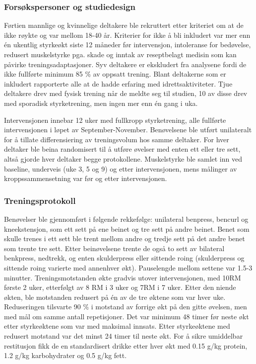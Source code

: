 \documentclass[
  letterpaper,
  DIV=11,
  numbers=noendperiod]{scrartcl}
\begin{document}
\hypertarget{forsuxf8kspersoner-og-studiedesign}{%
\subsubsection{Forsøkspersoner og
studiedesign}\label{forsuxf8kspersoner-og-studiedesign}}

Førtien mannlige og kvinnelige deltakere ble rekruttert etter kriteriet
om at de ikke røykte og var mellom 18-40 år. Kriterier for ikke å bli
inkludert var mer enn én ukentlig styrkeøkt siste 12 måneder før
intervensjon, intoleranse for bedøvelse, redusert muskelstyrke pga.
skade og inntak av reseptbelagt medisin som kan påvirke
treningsadaptasjoner. Syv deltakere er ekskludert fra analysene fordi de
ikke fullførte minimum 85 \% av oppsatt trening. Blant deltakerne som er
inkludert rapporterte alle at de hadde erfaring med idrettsaktiviteter.
Tjue deltakere drev med fysisk trening når de meldte seg til studien, 10
av disse drev med sporadisk styrketrening, men ingen mer enn én gang i
uka.

Intervensjonen innebar 12 uker med fullkropp styrketrening, alle
fullførte intervensjonen i løpet av September-November. Benøvelsene ble
utført unilateralt for å tillate differensiering av treningsvolum hos
samme deltaker. For hver deltaker ble beina randomisert til å utføre
øvelser med enten ett eller tre sett, altså gjorde hver deltaker begge
protokollene. Muskelstyrke ble samlet inn ved baseline, underveis (uke
3, 5 og 9) og etter intervensjonen, mens målinger av kroppssammensetning
var før og etter intervensjonen.

\hypertarget{treningsprotokoll}{%
\subsubsection{Treningsprotokoll}\label{treningsprotokoll}}

Benøvelser ble gjennomført i følgende rekkefølge: unilateral benpress,
bencurl og kneekstensjon, som ett sett på ene beinet og tre sett på
andre beinet. Benet som skulle trenes i ett sett ble trent mellom andre
og tredje sett på det andre benet som trente tre sett. Etter
beinøvelsene trente de også to sett av bilateral benkpress, nedtrekk, og
enten skulderpress eller sittende roing (skulderpress og sittende roing
varierte med annenhver økt). Pauselengde mellom settene var 1.5-3
minutter. Treningsmotstanden økte gradvis utover intervensjonen, med
10RM første 2 uker, etterfølgt av 8 RM i 3 uker og 7RM i 7 uker. Etter
den niende økten, ble motstanden redusert på én av de tre øktene som var
hver uke. Reduseringen tilsvarte 90 \% i motstand av forrige økt på den
gitte øvelsen, men med mål om samme antall repetisjoner. Det var minimum
48 timer før neste økt etter styrkeøktene som var med maksimal innsats.
Etter styrkeøktene med redusert motstand var det minst 24 timer til
neste økt. For å sikre umiddelbar restitusjon fikk de en standardisert
drikke etter hver økt med 0.15 g/kg protein, 1.2 g/kg karbohydrater og
0.5 g/kg fett.
\end{document}
